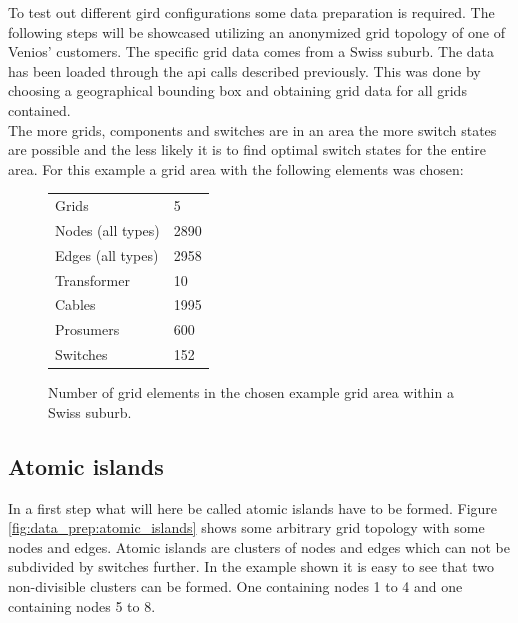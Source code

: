 
To test out different gird configurations some data preparation is required. The following
steps will be showcased utilizing an anonymized grid topology of one of Venios' customers. 
The specific grid data comes from a Swiss suburb. The data has been loaded through the api calls
described previously. This was done by choosing a geographical bounding box and obtaining grid
data for all grids contained.\\
The more grids, components and switches are in an area the more switch states are possible
and the less likely it is to find optimal switch states for the entire area. For this example
a grid area with the following elements was chosen:

\begin{figure}[H]
    \begin{center}
        \begin{tabular}{ll}
            Grids & 5\\
            Nodes (all types) & 2890\\
            Edges (all types) & 2958\\
            Transformer & 10\\
            Cables & 1995\\
            Prosumers & 600\\
            Switches & 152\\
        \end{tabular}
    \end{center}
    \caption{
        Number of grid elements in the chosen example grid area within a Swiss suburb.
    }
    \label{table:data_prep:swiss_suburban_numbers}
\end{figure}

\subsection{Atomic islands}

In a first step what will here be called atomic islands have to be formed. Figure \ref{fig:data_prep:atomic_islands}
shows some arbitrary grid topology with some nodes and edges. Atomic islands are clusters
of nodes and edges which can not be subdivided by switches further. In the example shown
it is easy to see that two non-divisible clusters can be formed. One containing nodes
1 to 4 and one containing nodes 5 to 8.

